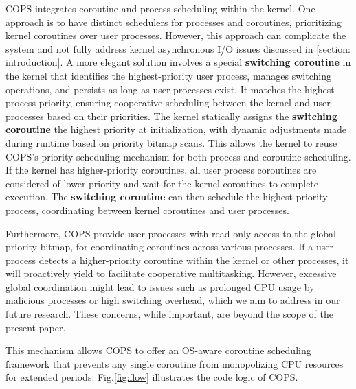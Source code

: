 \documentclass[conference]{IEEEtran}
\begin{document}
COPS integrates coroutine and process scheduling within the kernel. One approach is to have distinct schedulers for processes and coroutines, prioritizing kernel coroutines over user processes. However, this approach can complicate the system and not fully address kernel asynchronous I/O issues discussed in \ref{section: introduction}. A more elegant solution involves a special \textbf{switching coroutine} in the kernel that identifies the highest-priority user process, manages switching operations, and persists as long as user processes exist. It matches the highest process priority, ensuring cooperative scheduling between the kernel and user processes based on their priorities. The kernel statically assigns the \textbf{switching coroutine} the highest priority at initialization, with dynamic adjustments made during runtime based on priority bitmap scans. This allows the kernel to reuse COPS's priority scheduling mechanism for both process and coroutine scheduling. If the kernel has higher-priority coroutines, all user process coroutines are considered of lower priority and wait for the kernel coroutines to complete execution. The \textbf{switching coroutine} can then schedule the highest-priority process, coordinating between kernel coroutines and user processes.

Furthermore, COPS provide user processes with read-only access to the global priority bitmap, for coordinating coroutines across various processes. If a user process detects a higher-priority coroutine within the kernel or other processes, it will proactively yield to facilitate cooperative multitasking. However, excessive global coordination might lead to issues such as prolonged CPU usage by malicious processes or high switching overhead, which we aim to address in our future research. These concerns, while important, are beyond the scope of the present paper.

This mechanism allows COPS to offer an OS-aware coroutine scheduling framework that prevents any single coroutine from monopolizing CPU resources for extended periods. Fig.\ref{fig:flow} illustrates the code logic of COPS.
\end{document}
